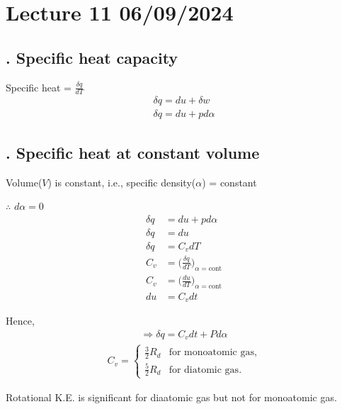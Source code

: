 \documentclass[fleqn,10pt]{SelfArx} %
\begin{document}
\clearpage

\section{Lecture 11 06/09/2024}

\subsection{. Specific heat capacity}
Specific heat = $\frac{\delta q}{dT}$
\begin{align}
    \delta q = du + \delta w \\ 
    \delta q = du + p d \alpha 
\end{align}

\subsection{. Specific heat at constant volume}
Volume($V$) is constant, i.e., specific density($\alpha$) = constant 

$\therefore$ $d \alpha = 0$
\begin{align}
    \delta q &= du + p d\alpha \\
    \delta q &= du \\
    \delta q &= C_vdT \\
    C_v &= \Big(\frac{\delta q}{dT}\Big)_{\alpha =\text{cont}}\\
    C_v &= \Big(\frac{du}{dT}\Big)_{\alpha =\text{cont}}\\
    du &= C_vdt
\end{align}

Hence,
\begin{align}
   \Rightarrow \delta q = C_vdt + Pd\alpha     \label{eq:1st_law_with_const_volume}
\end{align}
\begin{align*}
C_v = 
    \begin{cases} 
        \frac{3}{2} R_d & \text{for monoatomic gas}, \\
        \frac{5}{2} R_d & \text{for diatomic gas}.
    \end{cases}
\end{align*}

Rotational K.E. is significant for diaatomic gas but not for monoatomic gas.
\end{document}
